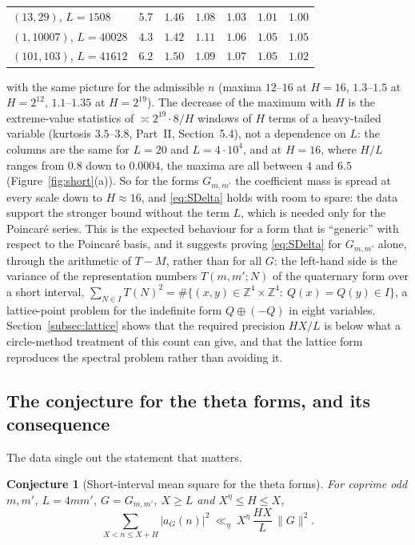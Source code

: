 \documentclass[11pt]{amsart}
\newtheorem{conjecture}[theorem]{Conjecture}
\theoremstyle{remark}
\newcommand{\Z}{\mathbb{Z}}
\begin{document}
\begin{enumerate}[label=\textup{(\alph*)},leftmargin=2.2em]
\begin{center}
\begin{tabular}{l|cccccc}
$(13,29)$, $L=1508$ & $5.7$ & $1.46$ & $1.08$ & $1.03$ & $1.01$ & $1.00$\\
$(1,10007)$, $L=40028$ & $4.3$ & $1.42$ & $1.11$ & $1.06$ & $1.05$ & $1.05$\\
$(101,103)$, $L=41612$ & $6.2$ & $1.50$ & $1.09$ & $1.07$ & $1.05$ & $1.02$\\
\bottomrule
\end{tabular}
\end{center}
with the same picture for the admissible $n$ (maxima $12$--$16$ at $H=16$, $1.3$--$1.5$ at $H=2^{12}$, $1.1$--$1.35$ at $H=2^{19}$). The decrease of the maximum with $H$ is the extreme-value statistics of $\asymp2^{19}\cdot8/H$ windows of $H$ terms of a heavy-tailed variable (kurtosis $3.5$--$3.8$, Part~II, Section~5.4), not a dependence on $L$: the columns are the same for $L=20$ and $L=4\cdot10^4$, and at $H=16$, where $H/L$ ranges from $0.8$ down to $0.0004$, the maxima are all between $4$ and $6.5$ (Figure~\ref{fig:short}(a)). So for the forms $G_{m,m'}$ the coefficient mass is spread at every scale down to $H\approx16$, and \eqref{eq:SDelta} holds with room to spare: the data support the stronger bound without the term $L$, which is needed only for the Poincar\'e series. This is the expected behaviour for a form that is ``generic'' with respect to the Poincar\'e basis, and it suggests proving \eqref{eq:SDelta} for $G_{m,m'}$ alone, through the arithmetic of $T-M$, rather than for all $G$: the left-hand side is the variance of the representation numbers $T(m,m';N)$ of the quaternary form over a short interval, $\sum_{N\in I}T(N)^2=\#\{(x,y)\in\Z^4\times\Z^4:\ Q(x)=Q(y)\in I\}$, a lattice-point problem for the indefinite form $Q\oplus(-Q)$ in eight variables. Section~\ref{subsec:lattice} shows that the required precision $HX/L$ is below what a circle-method treatment of this count can give, and that the lattice form reproduces the spectral problem rather than avoiding it.
\end{enumerate}

\subsection{The conjecture for the theta forms, and its consequence}
The data single out the statement that matters.

\begin{conjecture}[Short-interval mean square for the theta forms]\label{conj:short}
For coprime odd $m,m'$, $L=4mm'$, $G=G_{m,m'}$, $X\ge L$ and $X^{\eta}\le H\le X$,
\[
\sum_{X<n\le X+H}|a_G(n)|^2\ \ll_\eta\ X^{\eta}\,\frac{HX}{L}\,\|G\|^2 .
\]
\end{conjecture}
\end{document}
